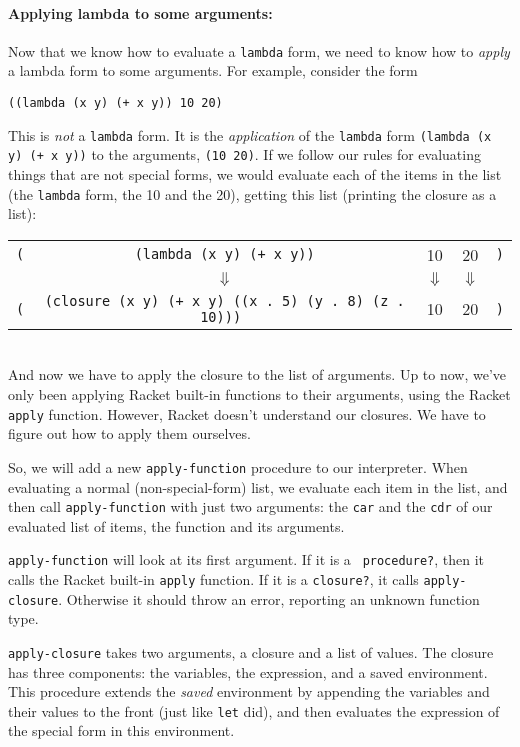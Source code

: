 \documentclass{article}
\begin{document}
\paragraph{Applying lambda to some arguments:}

Now that we know how to evaluate a {\tt lambda} form, we need to know
how to {\em apply} a lambda form to some arguments.  For example,
consider the form
\begin{Verbatim}[frame=single]
  ((lambda (x y) (+ x y)) 10 20)
\end{Verbatim}
This is {\em not} a {\tt lambda} form.  It is the {\em application} of
the {\tt lambda} form {\tt (lambda (x y) (+ x y))} to the arguments,
{\tt (10 20)}.  If we follow our rules for evaluating things that are
not special forms, we would evaluate each of the items in the list
(the {\tt lambda} form, the 10 and the 20), getting this list
(printing the closure as a list):\\
\begin{tabular}{|rcccl|}\hline
  {\tt (}&{\tt (lambda (x y) (+ x y))} & 10 & 20 & {\tt )}\\
         &  \ensuremath{\Downarrow} & \ensuremath{\Downarrow} & \ensuremath{\Downarrow} &\\
  {\tt (} & {\tt (closure (x y) (+ x y) {\color{blue}((x . 5) (y . 8) (z . 10))}) } & 10 &  20& {\tt )}\\\hline
\end{tabular}\\
And now we have to apply the closure to the list of arguments.  Up to
now, we've only been applying Racket built-in functions to their
arguments, using the Racket {\tt apply} function.  However, Racket
doesn't understand our closures.  We have to figure out how to apply
them ourselves.

So, we will add a new {\tt apply-function} procedure to our
interpreter.  When evaluating a normal (non-special-form) list, we
evaluate each item in the list, and then call {\tt apply-function}
with just two arguments: the {\tt car} and the {\tt cdr} of our
evaluated list of items, the function and its arguments.

{\tt apply-function} will look at its first argument.  If it is a {\tt
  procedure?}, then it calls the Racket built-in {\tt apply}
function.  If it is a {\tt closure?}, it calls {\tt apply-closure}.
Otherwise it should throw an error, reporting an unknown function
type.

{\tt apply-closure} takes two arguments, a closure and a list of
values.  The closure has three components: the variables, the
expression, and a saved environment.  This procedure extends the {\em
  saved} environment by appending the variables and their values to
the front (just like {\tt let} did), and then evaluates the expression
of the special form in this environment.
\end{document}
